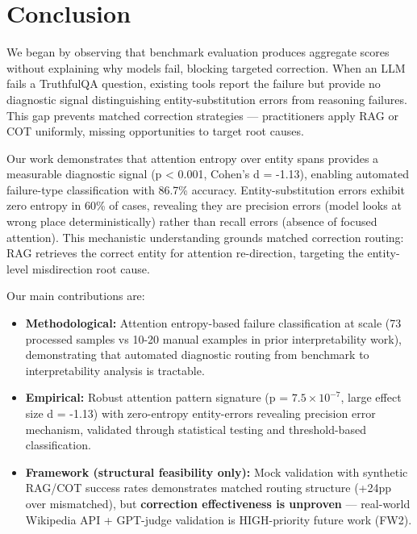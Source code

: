 \section{Conclusion}
\label{sec:conclusion}

We began by observing that benchmark evaluation produces aggregate scores without explaining why models fail, blocking targeted correction. When an LLM fails a TruthfulQA question, existing tools report the failure but provide no diagnostic signal distinguishing entity-substitution errors from reasoning failures. This gap prevents matched correction strategies --- practitioners apply RAG or COT uniformly, missing opportunities to target root causes.

Our work demonstrates that attention entropy over entity spans provides a measurable diagnostic signal (p < 0.001, Cohen's d = -1.13), enabling automated failure-type classification with 86.7\% accuracy. Entity-substitution errors exhibit zero entropy in 60\% of cases, revealing they are precision errors (model looks at wrong place deterministically) rather than recall errors (absence of focused attention). This mechanistic understanding grounds matched correction routing: RAG retrieves the correct entity for attention re-direction, targeting the entity-level misdirection root cause.

Our main contributions are:

\begin{itemize}
\item \textbf{Methodological:} Attention entropy-based failure classification at scale (73 processed samples vs 10-20 manual examples in prior interpretability work), demonstrating that automated diagnostic routing from benchmark to interpretability analysis is tractable.

\item \textbf{Empirical:} Robust attention pattern signature (p = $7.5 \times 10^{-7}$, large effect size d = -1.13) with zero-entropy entity-errors revealing precision error mechanism, validated through statistical testing and threshold-based classification.

\item \textbf{Framework (structural feasibility only):} Mock validation with synthetic RAG/COT success rates demonstrates matched routing structure (+24pp over mismatched), but \textbf{correction effectiveness is unproven} --- real-world Wikipedia API + GPT-judge validation is HIGH-priority future work (FW2).
\end{itemize}

